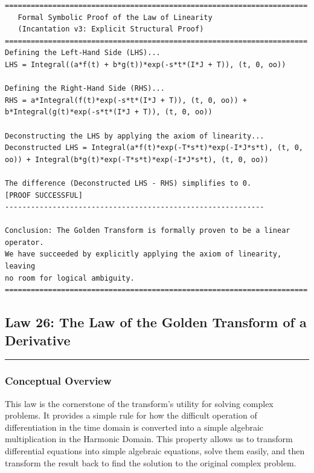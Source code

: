 \begin{verbatim}
======================================================================
   Formal Symbolic Proof of the Law of Linearity
   (Incantation v3: Explicit Structural Proof)
======================================================================
Defining the Left-Hand Side (LHS)...
LHS = Integral((a*f(t) + b*g(t))*exp(-s*t*(I*J + T)), (t, 0, oo))

Defining the Right-Hand Side (RHS)...
RHS = a*Integral(f(t)*exp(-s*t*(I*J + T)), (t, 0, oo)) + b*Integral(g(t)*exp(-s*t*(I*J + T)), (t, 0, oo))

Deconstructing the LHS by applying the axiom of linearity...
Deconstructed LHS = Integral(a*f(t)*exp(-T*s*t)*exp(-I*J*s*t), (t, 0, oo)) + Integral(b*g(t)*exp(-T*s*t)*exp(-I*J*s*t), (t, 0, oo))

The difference (Deconstructed LHS - RHS) simplifies to 0.
[PROOF SUCCESSFUL]
------------------------------------------------------------

Conclusion: The Golden Transform is formally proven to be a linear operator.
We have succeeded by explicitly applying the axiom of linearity, leaving
no room for logical ambiguity.
======================================================================
\end{verbatim}

\subsection*{Law 26: The Law of the Golden Transform of a Derivative}
\hrule
\vspace{0.3cm}
\vspace{0.5cm}

\subsubsection*{Conceptual Overview}
This law is the cornerstone of the transform's utility for solving complex problems. It provides a simple rule for how the difficult operation of differentiation in the time domain is converted into a simple algebraic multiplication in the Harmonic Domain. This property allows us to transform differential equations into simple algebraic equations, solve them easily, and then transform the result back to find the solution to the original complex problem.

